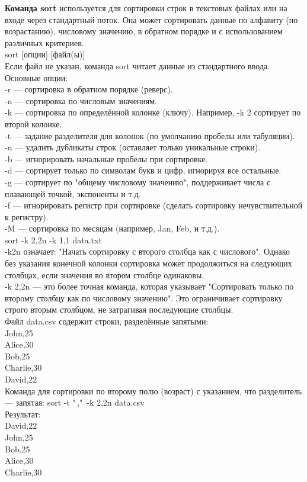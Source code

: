 \noindent \textbf{Команда sort} используется для сортировки строк в текстовых файлах или на входе через стандартный поток. Она может сортировать данные по алфавиту (по возрастанию), числовому значению, в обратном порядке и с использованием различных критериев. \\
sort [опции] [файл(ы)] \\
Если файл не указан, команда sort читает данные из стандартного ввода. \\
Основные опции: \\
-r — сортировка в обратном порядке (реверс). \\
-n — сортировка по числовым значениям. \\
-k — сортировка по определённой колонке (ключу). Например, -k 2 сортирует по второй колонке. \\
-t — задание разделителя для колонок (по умолчанию пробелы или табуляции). \\
-u — удалить дубликаты строк (оставляет только уникальные строки). \\
-b — игнорировать начальные пробелы при сортировке. \\
-d — сортирует только по символам букв и цифр, игнорируя все остальные. \\
-g — сортирует по "общему числовому значению", поддерживает числа с плавающей точкой, экспоненты и т.д. \\
-f — игнорировать регистр при сортировке (сделать сортировку нечувствительной к регистру). \\
-M — сортировка по месяцам (например, Jan, Feb, и т.д.). \\
sort -k 2,2n -k 1,1 data.txt \\
-k2n означает: "Начать сортировку с второго столбца как с числового". Однако без указания конечной колонки сортировка может продолжиться на следующих столбцах, если значения во втором столбце одинаковы. \\
-k 2,2n — это более точная команда, которая указывает "Сортировать только по второму столбцу как по числовому значению". Это ограничивает сортировку строго вторым столбцом, не затрагивая последующие столбцы. \\
Файл data.csv содержит строки, разделённые запятыми: \\
John,25 \\
Alice,30 \\
Bob,25 \\
Charlie,30 \\
David,22 \\
Команда для сортировки по второму полю (возраст) с указанием, что разделитель — запятая: sort -t "\,,"\, -k 2,2n data.csv \\
Результат: \\
David,22 \\
John,25 \\
Bob,25 \\
Alice,30 \\
Charlie,30 \\

